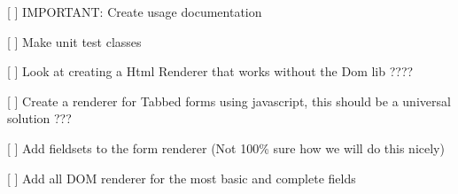
\begin{DoxyItemize}
\item \mbox{[} \mbox{]} I\+M\+P\+O\+R\+T\+A\+N\+T\+: Create usage documentation
\item \mbox{[} \mbox{]} Make unit test classes
\item \mbox{[} \mbox{]} Look at creating a Html Renderer that works without the Dom lib ????
\item \mbox{[} \mbox{]} Create a renderer for Tabbed forms using javascript, this should be a universal solution ???
\item \mbox{[} \mbox{]} Add fieldsets to the form renderer (Not 100\% sure how we will do this nicely)
\item \mbox{[} \mbox{]} Add all D\+O\+M renderer for the most basic and complete fields 
\end{DoxyItemize}